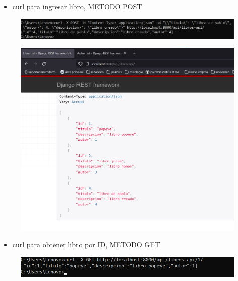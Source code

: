 \documentclass{article}
\begin{document}
	\begin{itemize}
		\item curl para ingresar libro, METODO POST
	\end{itemize}
	\begin{figure}[H]
		\centering
		\includegraphics[width=1\textwidth,keepaspectratio]{pruebas/curlIngresarLibro.png}
	\end{figure}
	\begin{figure}[H]
		\centering
		\includegraphics[width=1\textwidth,keepaspectratio]{pruebas/tarea-libro-ingresado.png}
	\end{figure}
	\clearpage
	
	\begin{itemize}
		\item curl para obtener libro por ID, METODO GET
	\end{itemize}
	\begin{figure}[H]
		\centering
		\includegraphics[width=1\textwidth,keepaspectratio]{pruebas/curlObtenerLibroId.png}
	\end{figure}
	
\end{document}

